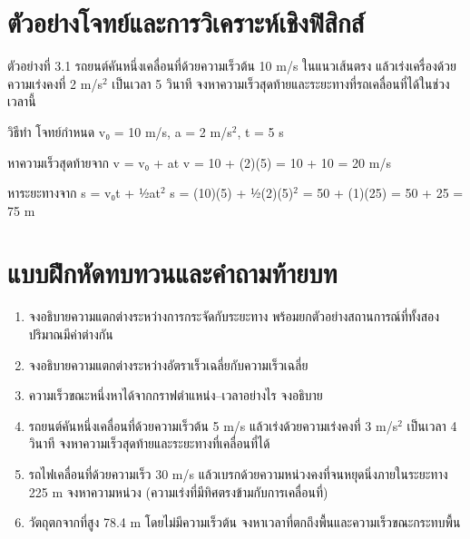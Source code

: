 \section{ตัวอย่างโจทย์และการวิเคราะห์เชิงฟิสิกส์}

\begin{examplebox}
ตัวอย่างที่ 3.1 รถยนต์คันหนึ่งเคลื่อนที่ด้วยความเร็วต้น 10 m/s ในแนวเส้นตรง แล้วเร่งเครื่องด้วยความเร่งคงที่ 2 m/s$^2$ เป็นเวลา 5 วินาที จงหาความเร็วสุดท้ายและระยะทางที่รถเคลื่อนที่ได้ในช่วงเวลานี้

วิธีทำ โจทย์กำหนด v₀ = 10 m/s, a = 2 m/s$^2$, t = 5 s

หาความเร็วสุดท้ายจาก v = v₀ + at v = 10 + (2)(5) = 10 + 10 = 20 m/s

หาระยะทางจาก s = v₀t + ½at$^2$ s = (10)(5) + ½(2)(5)$^2$ = 50 + (1)(25) = 50 + 25 = 75 m
\end{examplebox}

\section{แบบฝึกหัดทบทวนและคำถามท้ายบท}

\begin{enumerate}
    \item จงอธิบายความแตกต่างระหว่างการกระจัดกับระยะทาง พร้อมยกตัวอย่างสถานการณ์ที่ทั้งสองปริมาณมีค่าต่างกัน
    \item จงอธิบายความแตกต่างระหว่างอัตราเร็วเฉลี่ยกับความเร็วเฉลี่ย
    \item ความเร็วขณะหนึ่งหาได้จากกราฟตำแหน่ง–เวลาอย่างไร จงอธิบาย
    \item รถยนต์คันหนึ่งเคลื่อนที่ด้วยความเร็วต้น 5 m/s แล้วเร่งด้วยความเร่งคงที่ 3 m/s$^2$ เป็นเวลา 4 วินาที จงหาความเร็วสุดท้ายและระยะทางที่เคลื่อนที่ได้
    \item รถไฟเคลื่อนที่ด้วยความเร็ว 30 m/s แล้วเบรกด้วยความหน่วงคงที่จนหยุดนิ่งภายในระยะทาง 225 m จงหาความหน่วง (ความเร่งที่มีทิศตรงข้ามกับการเคลื่อนที่)
    \item วัตถุตกจากที่สูง 78.4 m โดยไม่มีความเร็วต้น จงหาเวลาที่ตกถึงพื้นและความเร็วขณะกระทบพื้น
\end{enumerate}

